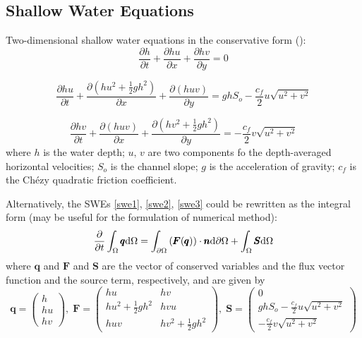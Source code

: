 \documentclass{jfm}
\newcommand{\pa}[2]{\frac{\partial#1}{\partial#2}}
\newcommand{\md}{{\rm{d}}}
\begin{document}
\subsection{Shallow Water Equations}
Two-dimensional shallow water equations in the conservative form (\cite{Toro2001}):
\begin{equation}
	\pa{h}{t}+\pa{hu}{x}+\pa{hv}{y}=0
	\label{swe1}
\end{equation}

\begin{equation}
	\pa{hu}{t}+\pa{(hu^2+\frac{1}{2}gh^2)}{x}+\pa{(huv)}{y}= ghS_o-\frac{c_f}{2}u\sqrt{u^2+v^2}
	\label{swe2}
\end{equation}

\begin{equation}
	\pa{hv}{t}+\pa{(huv)}{x}+\pa{(hv^2+\frac{1}{2}gh^2)}{y}= -\frac{c_f}{2}v\sqrt{u^2+v^2}
	\label{swe3}
\end{equation}
where $h$ is the water depth; $u,\,v$ are two components fo the depth-averaged horizontal velocities; $S_o$ is the channel slope; $g$ is the acceleration of gravity; $c_f$ is the Ch\'ezy quadratic friction coefficient.

Alternatively, the SWEs \autoref{swe1}, \autoref{swe2}, \autoref{swe3}  could be rewritten as the integral form (may be useful for the formulation of numerical method):
\begin{equation}
\pa{}{t}\int_{\Omega}\pmb{q}\md \Omega = \int_{\partial \Omega}\left (  \pmb{F}(\pmb{q}) \right ) \cdot \pmb{n} \md \partial \Omega+\int_{\Omega} \pmb{S}\md \Omega
\label{swe11}
\end{equation}
where $\pmb{q}$ and $\pmb{{F}}$ and $ \pmb{S}$ are  the vector of conserved variables and  the flux vector function and the source term, respectively, and are given by
\begin{equation}
{\pmb q} = \left( \begin{array}{c} h\\
	hu \\
	hv \end{array} \right) ,
 \; {\pmb{F}} =\begin{pmatrix}
	hu & hv \\
	hu^2+\frac{1}{2}gh^2 & hvu \\
	huv & hv^2+\frac{1}{2}gh^2
\end{pmatrix} ,
 \; \pmb{S} =  \left( \begin{array}{c}
	0 \\
	ghS_o-\frac{c_f}{2}u\sqrt{u^2+v^2} \\
	-\frac{c_f}{2}v\sqrt{u^2+v^2}
	\end{array}
\right)
\end{equation}
\end{document}
